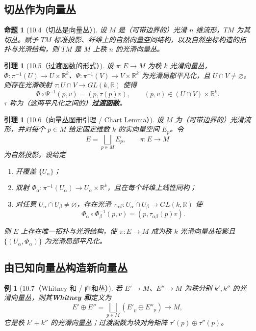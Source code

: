 \documentclass[12pt]{article}
\newtheorem{lemma}[definition]{引理}
\newtheorem{proposition}[definition]{命题}
\newtheorem{example}[definition]{例}
\begin{document}
\subsection{切丛作为向量丛}

\begin{proposition}[10.4（切丛是向量丛）]
设 $M$ 是（可带边界的）光滑 $n$ 维流形，$TM$ 为其切丛。赋予 $TM$ 标准投影、纤维上的自然向量空间结构，以及自然坐标构造的拓扑与光滑结构，则 $TM$ 是 $M$ 上秩 $n$ 的光滑向量丛。
\end{proposition}

\begin{lemma}[10.5（过渡函数的形式）]
设 $\pi:E\to M$ 为秩 $k$ 光滑向量丛，$\Phi:\pi^{-1}(U)\to U\times\mathbb{R}^k$、$\Psi:\pi^{-1}(V)\to V\times\mathbb{R}^k$ 为光滑局部平凡化，且 $U\cap V\neq\varnothing$。
则存在光滑映射 $\tau:U\cap V\to GL(k,\mathbb{R})$ 使得
\[
\Phi\circ\Psi^{-1}(p,v)=(p,\tau(p)v),\qquad (p,v)\in (U\cap V)\times\mathbb{R}^k.
\]
$\tau$ 称为（这两平凡化之间的）\textbf{过渡函数}。
\end{lemma}

\begin{lemma}[10.6（向量丛图册引理 / Chart Lemma）]
设 $M$ 为（可带边界的）光滑流形，并对每个 $p\in M$ 给定固定维数 $k$ 的实向量空间 $E_p$。令
\[
E=\bigsqcup_{p\in M}E_p,\qquad \pi:E\to M
\]
为自然投影。设给定
\begin{enumerate}[label=(\roman*)]
\item 开覆盖 $\{U_\alpha\}$；
\item 双射 $\Phi_\alpha:\pi^{-1}(U_\alpha)\to U_\alpha\times\mathbb{R}^k$，且在每个纤维上线性同构；
\item 对任意 $U_\alpha\cap U_\beta\neq\varnothing$，存在光滑 $\tau_{\alpha\beta}:U_\alpha\cap U_\beta\to GL(k,\mathbb{R})$ 使
\[
\Phi_\alpha\circ\Phi_\beta^{-1}(p,v)=(p,\tau_{\alpha\beta}(p)v).
\]
\end{enumerate}
则 $E$ 上存在唯一拓扑与光滑结构，使 $\pi:E\to M$ 成为秩 $k$ 光滑向量丛投影且 $\{(U_\alpha,\Phi_\alpha)\}$ 为光滑局部平凡化。
\end{lemma}

\subsection{由已知向量丛构造新向量丛}

\begin{example}[10.7（Whitney 和 / 直和丛）]
若 $E'\to M$、$E''\to M$ 为秩分别 $k',k''$ 的光滑向量丛，则其\textbf{Whitney 和}定义为
\[
E'\oplus E''=\bigsqcup_{p\in M}(E'_p\oplus E''_p)\to M,
\]
它是秩 $k'+k''$ 的光滑向量丛；过渡函数为块对角矩阵 $\tau'(p)\oplus\tau''(p)$。
\end{example}
\end{document}
